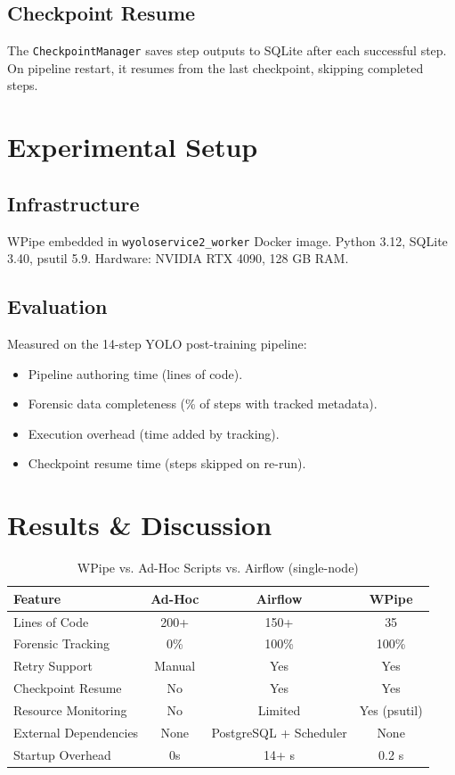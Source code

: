 \documentclass[10pt,twocolumn,letterpaper]{article}
\begin{document}
\subsection{Checkpoint Resume}
The \texttt{CheckpointManager} saves step outputs to SQLite after each successful step. On pipeline restart, it resumes from the last checkpoint, skipping completed steps.

\section{Experimental Setup}
\subsection{Infrastructure}
WPipe embedded in \texttt{wyoloservice2\_worker} Docker image. Python 3.12, SQLite 3.40, psutil 5.9. Hardware: NVIDIA RTX 4090, 128 GB RAM.

\subsection{Evaluation}
Measured on the 14-step YOLO post-training pipeline:
\begin{itemize}
    \item Pipeline authoring time (lines of code).
    \item Forensic data completeness (\% of steps with tracked metadata).
    \item Execution overhead (time added by tracking).
    \item Checkpoint resume time (steps skipped on re-run).
\end{itemize}

\section{Results \& Discussion}

\begin{table}[htbp]
\centering
\caption{WPipe vs. Ad-Hoc Scripts vs. Airflow (single-node)}
\label{tab:comparison}
\begin{tabular}{@{}lccc@{}}
\toprule
\textbf{Feature} & \textbf{Ad-Hoc} & \textbf{Airflow} & \textbf{WPipe} \\
\midrule
Lines of Code & 200+ & 150+ & 35 \\
Forensic Tracking & 0\% & 100\% & 100\% \\
Retry Support & Manual & Yes & Yes \\
Checkpoint Resume & No & Yes & Yes \\
Resource Monitoring & No & Limited & Yes (psutil) \\
External Dependencies & None & PostgreSQL + Scheduler & None \\
Startup Overhead & 0s & 14+ s & 0.2 s \\
\bottomrule
\end{tabular}
\end{table}
\end{document}
